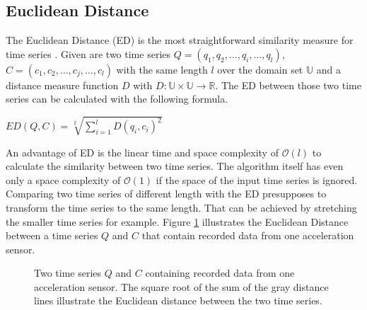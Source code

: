 \subsection{Euclidean Distance} \label{euclidean_distance}
The Euclidean Distance (ED) is the most straightforward similarity measure for time series \cite{ding2008querying}.
Given are two time series $Q = (q_1, q_2, \dots, q_i, \dots, q_l)$, $C = (c_1, c_2, \dots, c_j, \dots, c_l)$ with the
same length $l$ over the domain set $\mathbb{U}$ and a distance measure function $D$ with
$D: \mathbb{U} \times \mathbb{U} \to \mathbb{R}$. The ED between those two time series can be calculated with the
following formula.

\begin{center}
    $ED(Q, C) = \sqrt[2]{\sum \limits_{i=1}^{l} D(q_i, c_i)^2}$
\end{center}

An advantage of ED is the linear time and space complexity of $\mathcal{O}(l)$ to calculate the similarity between two
time series. The algorithm itself has even only a space complexity of $\mathcal{O}(1)$ if the space of the input time
series is ignored. Comparing two time series of different length with the ED presupposes to transform the time series
to the same length. That can be achieved by stretching the smaller time series for example. Figure
\ref{fig:euclideandistance} illustrates the Euclidean Distance between a time series $Q$ and $C$ that contain recorded
data from one acceleration sensor.

\begin{figure}[H]
    \begin{center}
    \end{center}
    \caption{Two time series $Q$ and $C$ containing recorded data from one acceleration sensor. The square root of the
    sum of the gray distance lines illustrate the Euclidean distance between the two time series.}
    \label{fig:euclideandistance}
\end{figure}
